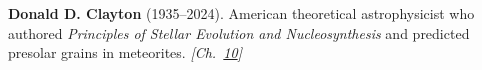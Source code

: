 \textbf{Donald D. Clayton} (1935–2024). American theoretical astrophysicist who authored \emph{Principles of Stellar Evolution and Nucleosynthesis} and predicted presolar grains in meteorites. \emph{[Ch.~\hyperref[ch:solarfusionquantumtunneling]{10}]}

